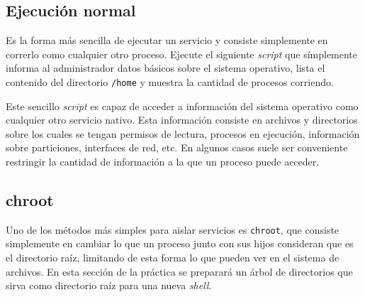\subsection{Ejecución normal}
\begin{questions}
  \question Es la forma más sencilla de ejecutar un servicio y consiste
  simplemente en correrlo como cualquier otro proceso. Ejecute el siguiente
  \textit{script} que símplemente informa al administrador datos básicos
  sobre el sistema operativo, lista el contenido del directorio
  \texttt{/home} y muestra la cantidad de procesos corriendo.
  
  

  Este sencillo \textit{script} es capaz de acceder a información del
  sistema operativo como cualquier otro servicio nativo. Esta información
  consiste en archivos y directorios sobre los cuales se tengan permisos de
  lectura, procesos en ejecución, información sobre particiones, interfaces
  de red, etc. En algunos casos suele ser conveniente restringir la
  cantidad de información a la que un proceso puede acceder.
  
\end{questions}

\subsection{chroot}
Uno de los métodos más simples para aislar servicios es \texttt{chroot},
que consiste simplemente en cambiar lo que un proceso junto con sus hijos
consideran que es el directorio raíz, limitando de esta forma lo que pueden
ver en el sistema de archivos. En esta sección de la práctica se preparará
un árbol de directorios que sirva como directorio raíz para una nueva
\textit{shell}.

